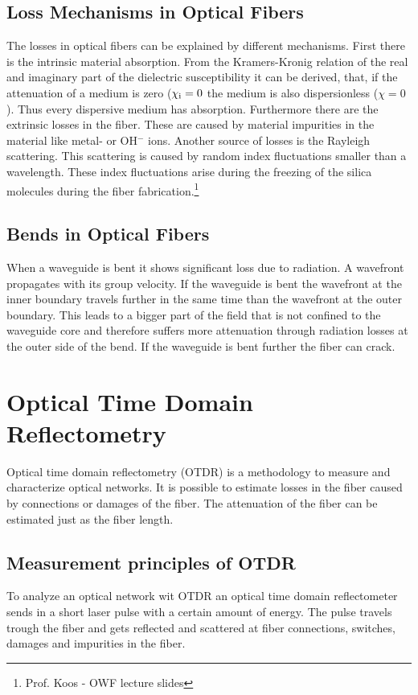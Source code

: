 \subsection{Loss Mechanisms in Optical Fibers}
\label{loss}
The losses in optical fibers can be explained by different mechanisms. First there is the intrinsic material absorption. From the Kramers-Kronig relation of the real and imaginary part of the dielectric susceptibility it can be derived, that, if the attenuation of a medium is zero ($\chi_{\mathrm{i}}=0$ the medium is also dispersionless ($\chi=0$). Thus every dispersive medium has absorption. Furthermore there are the extrinsic losses in the fiber. These are caused by material impurities in the material like metal- or OH$^-$ ions. Another source of losses is the Rayleigh scattering. This scattering is caused by random index fluctuations smaller than a wavelength. These index fluctuations arise during the freezing of the silica molecules during the fiber fabrication.\footnote[1]{Prof. Koos - OWF lecture slides}

\subsection{Bends in Optical Fibers}

When a waveguide is bent it shows significant loss due to radiation. A wavefront propagates with its group velocity. If the waveguide is bent the wavefront at the inner boundary travels further in the same time than the wavefront at the outer boundary. This leads to a bigger part of the field that is not confined to the waveguide core and therefore suffers more attenuation through radiation losses at the outer side of the bend. If the waveguide is bent further the fiber can crack.\footnotemark[1]%


\section{Optical Time Domain Reflectometry}
Optical time domain reflectometry (OTDR) is a methodology to measure and characterize optical networks. It is possible to estimate losses in the fiber caused by connections or damages of the fiber. The attenuation of the fiber can be estimated just as the fiber length.

\subsection{Measurement principles of OTDR}
\label{subsec:Principle}
To analyze an optical network wit OTDR an optical time domain reflectometer sends in a short laser pulse with a certain amount of energy. The pulse travels trough the fiber and gets reflected and scattered at fiber connections, switches, damages and impurities in the fiber. 

